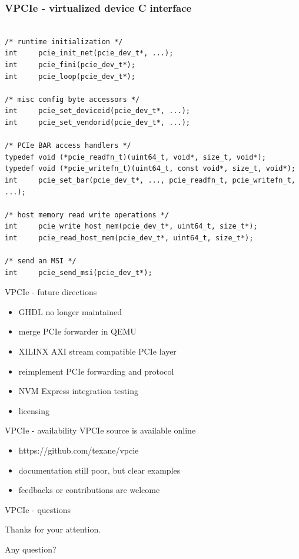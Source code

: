 \documentclass{beamer}
\begin{document}
\begin{frame}[containsverbatim]
 \frametitle{VPCIe - virtualized device C interface}
 \begin{tiny}
 \lstset{language=C}
 \begin{lstlisting}[frame=tb]

/* runtime initialization */
int     pcie_init_net(pcie_dev_t*, ...);
int     pcie_fini(pcie_dev_t*);
int     pcie_loop(pcie_dev_t*);

/* misc config byte accessors */
int     pcie_set_deviceid(pcie_dev_t*, ...);
int     pcie_set_vendorid(pcie_dev_t*, ...);

/* PCIe BAR access handlers */
typedef void (*pcie_readfn_t)(uint64_t, void*, size_t, void*);
typedef void (*pcie_writefn_t)(uint64_t, const void*, size_t, void*);
int     pcie_set_bar(pcie_dev_t*, ..., pcie_readfn_t, pcie_writefn_t, ...);

/* host memory read write operations */
int     pcie_write_host_mem(pcie_dev_t*, uint64_t, size_t*);
int     pcie_read_host_mem(pcie_dev_t*, uint64_t, size_t*);

/* send an MSI */
int     pcie_send_msi(pcie_dev_t*);
 \end{lstlisting}
 \end{tiny}
\end{frame}

\begin{frame}{VPCIe - future directions}
  \begin{itemize}
  \item GHDL no longer maintained
  \item merge PCIe forwarder in QEMU
  \item XILINX AXI stream compatible PCIe layer
  \item reimplement PCIe forwarding and protocol
  \item NVM Express integration testing
  \item licensing
  \end{itemize}
\end{frame}

\begin{frame}{VPCIe - availability}
  VPCIe source is available online
  \begin{itemize}
  \item https://github.com/texane/vpcie
  \item documentation still poor, but clear examples
  \item feedbacks or contributions are welcome
  \end{itemize}
\end{frame}

\begin{frame}{VPCIe - questions}
  \begin{center} Thanks for your attention. \end{center}
  \begin{center} Any question? \end{center}
\end{frame}
\end{document}
